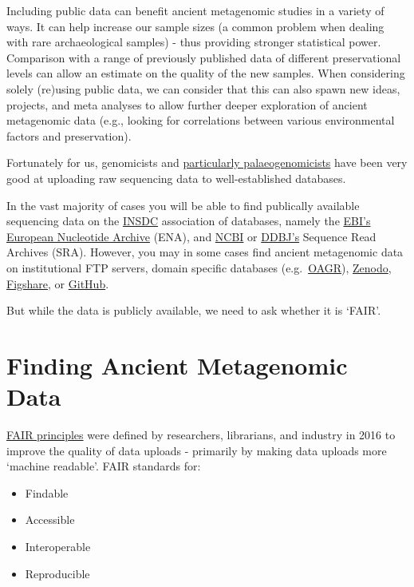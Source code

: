\documentclass[
  letterpaper,
]{book}
\providecommand{\tightlist}{%
  \setlength{\itemsep}{0pt}\setlength{\parskip}{0pt}}\usepackage{longtable,booktabs,array}
\begin{document}
Including public data can benefit ancient metagenomic studies in a
variety of ways. It can help increase our sample sizes (a common problem
when dealing with rare archaeological samples) - thus providing stronger
statistical power. Comparison with a range of previously published data
of different preservational levels can allow an estimate on the quality
of the new samples. When considering solely (re)using public data, we
can consider that this can also spawn new ideas, projects, and meta
analyses to allow further deeper exploration of ancient metagenomic data
(e.g., looking for correlations between various environmental factors
and preservation).

Fortunately for us, genomicists and
\href{http://dx.doi.org/10.1371/journal.pone.0121409}{particularly
palaeogenomicists} have been very good at uploading raw sequencing data
to well-established databases.

In the vast majority of cases you will be able to find publically
available sequencing data on the \href{https://www.insdc.org/}{INSDC}
association of databases, namely the
\href{https://www.ebi.ac.uk/ena/}{EBI's European Nucleotide Archive}
(ENA), and \href{https://www.ncbi.nlm.nih.gov/sra}{NCBI} or
\href{https://www.ddbj.nig.ac.jp/dra/index-e.html}{DDBJ's} Sequence Read
Archives (SRA). However, you may in some cases find ancient metagenomic
data on institutional FTP servers, domain specific databases
(e.g.~\href{https://oagr.org}{OAGR}), \href{https://zenodo.org}{Zenodo},
\href{https://figshare.com}{Figshare}, or
\href{https://github.com}{GitHub}.

But while the data is publicly available, we need to ask whether it is
`FAIR'.

\hypertarget{finding-ancient-metagenomic-data}{%
\section{Finding Ancient Metagenomic
Data}\label{finding-ancient-metagenomic-data}}

\href{http://dx.doi.org/10.1038/sdata.2016.18}{FAIR principles} were
defined by researchers, librarians, and industry in 2016 to improve the
quality of data uploads - primarily by making data uploads more `machine
readable'. FAIR standards for:

\begin{itemize}
\tightlist
\item
  Findable
\item
  Accessible
\item
  Interoperable
\item
  Reproducible
\end{itemize}
\end{document}

